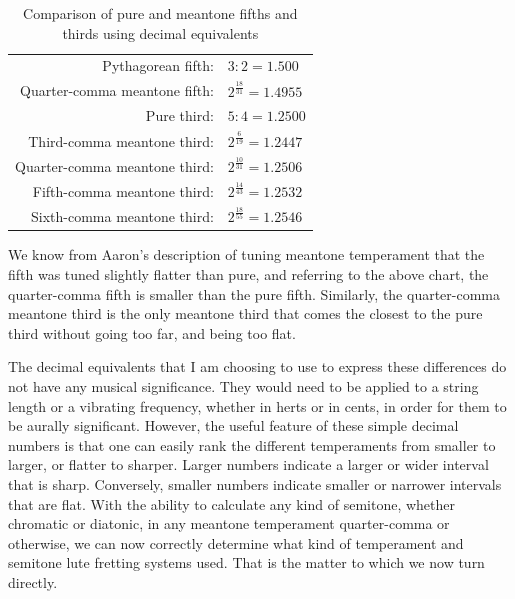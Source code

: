 \begin{table}[h!]
    \begin{center}
    \begin{tabular}{ r l }
        Pythagorean fifth:            & $ 3:2 = 1.500 $ \\
        Quarter-comma meantone fifth: & $ 2^\frac{18}{31} = 1.4955 $ \\
        \hline
        Pure third:                   & $ 5:4 = 1.2500 $ \\
        Third-comma meantone third:   & $ 2^\frac{6}{19} = 1.2447 $ \\
        Quarter-comma meantone third: & $ 2^\frac{10}{31} = 1.2506 $ \\
        Fifth-comma meantone third:   & $ 2^\frac{14}{43} = 1.2532 $ \\
        Sixth-comma meantone third:   & $ 2^\frac{18}{55} = 1.2546 $ \\
    \end{tabular}
    \end{center}
    \caption{Comparison of pure and meantone fifths and thirds using decimal equivalents}
\end{table}
We know from Aaron's description of tuning meantone temperament that the fifth was tuned
slightly flatter than pure, and referring to the above chart, the quarter-comma fifth
is smaller than the pure fifth.  Similarly, the quarter-comma meantone third is the
only meantone third that comes the closest to the pure third without going too far,
and being too flat.

The decimal equivalents that I am choosing to use to express these differences do not
have any musical significance.  They would need to be applied to a string length or
a vibrating frequency, whether in herts or in cents, in order for them to be aurally
significant.  However, the useful feature of these simple decimal numbers is that one
can easily rank the different temperaments from smaller to larger, or flatter to sharper.
Larger numbers indicate a larger or wider interval that is sharp.  Conversely, smaller
numbers indicate smaller or narrower intervals that are flat.  With the ability to calculate
any kind of semitone, whether chromatic or diatonic, in any meantone temperament quarter-comma
or otherwise, we can now correctly determine what kind of temperament and semitone lute fretting
systems used.  That is the matter to which we now turn directly.
